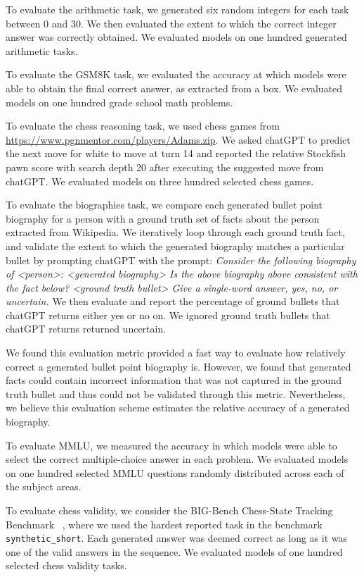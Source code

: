  To evaluate the arithmetic task, we generated six random integers for each task between 0 and 30. We then evaluated the extent to which the correct integer answer was correctly obtained. We evaluated models on one hundred generated arithmetic tasks.

 To evaluate the GSM8K task, we evaluated the accuracy at which models were able to obtain the final correct answer, as extracted from a box. We evaluated models on one hundred grade school math problems.

 To evaluate the chess reasoning task, we used chess games from \url{https://www.pgnmentor.com/players/Adams.zip}. We asked chatGPT to predict the next move for white to move at turn 14 and  reported the relative Stockfish pawn score with search depth 20 after executing the suggested move from chatGPT.  We evaluated models on three hundred selected chess games.

 To evaluate the biographies task, we compare each generated bullet point biography for a person with a ground truth set of facts about the person extracted from Wikipedia. We iteratively loop through each ground truth fact, and validate the extent to which the generated biography matches a particular bullet by prompting chatGPT with the prompt: \emph{Consider the following biography of <person>: <generated biography>  Is the above biography above consistent with the fact below? <ground truth bullet> Give a single-word answer, yes, no, or uncertain.} We then evaluate and report the percentage of ground bullets that chatGPT returns either yes or no on. We ignored ground truth bullets that chatGPT returns returned uncertain.

We found this evaluation metric provided a fast way to evaluate how relatively correct a generated bullet point biography is. However, we found that generated facts could contain incorrect information that was not captured in the ground truth bullet and thus could not be validated through this metric. Nevertheless, we believe this evaluation scheme estimates the relative accuracy of a generated biography.

 To evaluate MMLU, we measured the accuracy in which models were able to select the correct multiple-choice answer in each problem. We evaluated models on one hundred selected MMLU questions randomly distributed across each of the subject areas.

 To evaluate chess validity, we consider the BIG-Bench Chess-State Tracking Benchmark ~\cite{srivastava2022beyond}, where we used the hardest reported task in the benchmark \texttt{synthetic\_short}. Each generated answer was deemed correct as long as it was one of the valid answers in the sequence. We evaluated models of one hundred selected chess validity tasks.

